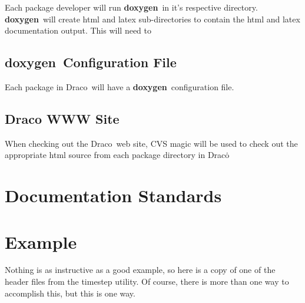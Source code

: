 \documentclass[11pt]{nmemo}
\newcommand{\draco}{{\normalfont\sffamily Draco}}
\newcommand{\doxy}{{\normalfont\bfseries doxygen}}
\begin{document}
Each package developer will run \doxy\ in it's respective directory. 
\doxy\ will create html and latex sub-directories to contain the
html and latex documentation output. This will need to 
  \subsection{\doxy\ Configuration File}
  Each package in \draco\ will have a \doxy\ configuration file.
  \subsection{Draco WWW Site}
When checking out the \draco\ web site,
CVS magic will be used to check out the appropriate html source
from each package directory in \draco\.

\section{Documentation Standards}

\section{Example}
Nothing is as instructive as a good example, so here is a copy of
one of the header files from the timestep utility. Of course,
there is more than one way to accomplish this, but this is one way.
\end{document}
